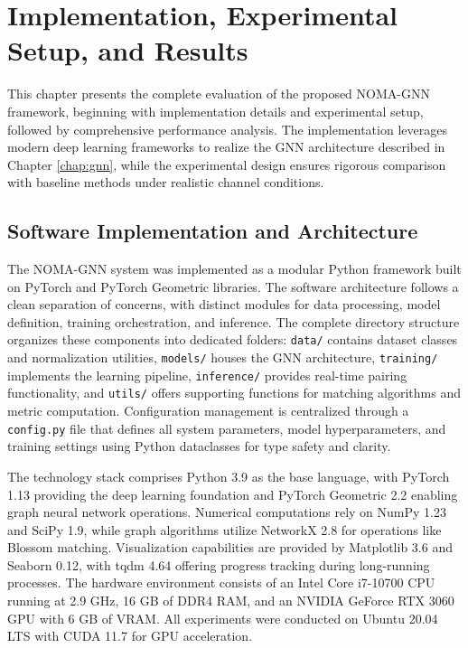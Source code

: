 \chapter{Implementation, Experimental Setup, and Results}
\label{chap:results}

This chapter presents the complete evaluation of the proposed NOMA-GNN framework, beginning with implementation details and experimental setup, followed by comprehensive performance analysis. The implementation leverages modern deep learning frameworks to realize the GNN architecture described in Chapter \ref{chap:gnn}, while the experimental design ensures rigorous comparison with baseline methods under realistic channel conditions.

\section{Software Implementation and Architecture}

The NOMA-GNN system was implemented as a modular Python framework built on PyTorch and PyTorch Geometric libraries. The software architecture follows a clean separation of concerns, with distinct modules for data processing, model definition, training orchestration, and inference. The complete directory structure organizes these components into dedicated folders: \texttt{data/} contains dataset classes and normalization utilities, \texttt{models/} houses the GNN architecture, \texttt{training/} implements the learning pipeline, \texttt{inference/} provides real-time pairing functionality, and \texttt{utils/} offers supporting functions for matching algorithms and metric computation. Configuration management is centralized through a \texttt{config.py} file that defines all system parameters, model hyperparameters, and training settings using Python dataclasses for type safety and clarity.

The technology stack comprises Python 3.9 as the base language, with PyTorch 1.13 providing the deep learning foundation and PyTorch Geometric 2.2 enabling graph neural network operations. Numerical computations rely on NumPy 1.23 and SciPy 1.9, while graph algorithms utilize NetworkX 2.8 for operations like Blossom matching. Visualization capabilities are provided by Matplotlib 3.6 and Seaborn 0.12, with tqdm 4.64 offering progress tracking during long-running processes. The hardware environment consists of an Intel Core i7-10700 CPU running at 2.9 GHz, 16 GB of DDR4 RAM, and an NVIDIA GeForce RTX 3060 GPU with 6 GB of VRAM. All experiments were conducted on Ubuntu 20.04 LTS with CUDA 11.7 for GPU acceleration.

